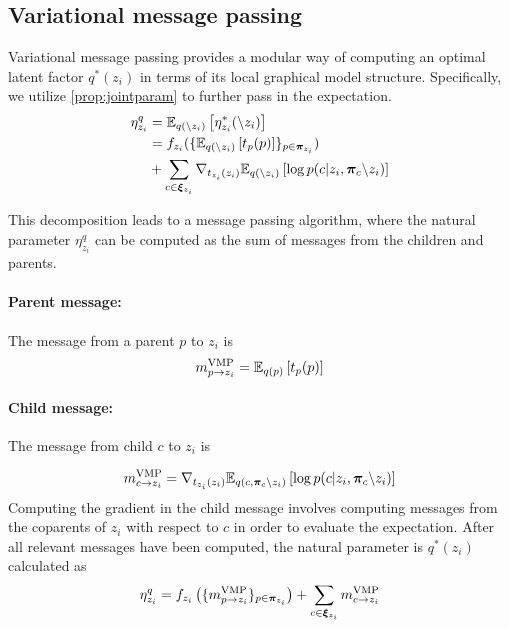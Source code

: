 \subsection{Variational message passing}

Variational message passing provides a modular way of
computing
an optimal latent factor $q^*(z_i)$
in terms of its local graphical model structure.
Specifically, we utilize \autoref{prop:jointparam}
to further pass in the expectation.
\begin{equation}
\begin{split}
    \eta^q_{z_i} &= \mathbb{E}_{q(\backslash z_i)}\left[\eta^*_{z_i}(\backslash z_i)\right] \\
                 &= f_{z_i}(\{\mathbb{E}_{q(\backslash z_i)}\left[t_p(p)\right]\}_{p \in \bm{\pi}_{z_i}}) \\
                 &+ \sum_{c \in \bm{\xi}_{z_i}} 
         \nabla_{t_{z_i}(z_i)} \mathbb{E}_{q(\backslash z_i)}\left[\log p(c | z_i, \bm{\pi}_{c} \backslash z_i)\right]
\end{split}
\end{equation}

This decomposition leads to a message passing algorithm, where
the natural parameter $\eta^q_{z_i}$
can be computed as the sum of messages from the children and parents.
\paragraph{Parent message:}
The message from a parent $p$ to $z_i$ is
\begin{equation} \label{eq:parentmessage}
    m^{\text{VMP}}_{p \rightarrow z_i} = \mathbb{E}_{q(p)}\left[t_p(p)\right]
\end{equation}

\paragraph{Child message:}
The message from child $c$ to $z_i$ is

\begin{equation} \label{eq:childmessage}
    m^{\text{VMP}}_{c \rightarrow z_i} = \nabla_{t_{z_i}(z_i)} \mathbb{E}_{q(c, \bm{\pi}_{c} \backslash z_i)}\left[\log p(c | z_i, \bm{\pi}_{c} \backslash z_i)\right]
\end{equation}
Computing the gradient in the child message involves
computing messages from the coparents of $z_i$ with respect to $c$ in order to evaluate the expectation.
After all relevant messages
have been computed, the natural parameter is $q^*(z_i)$ calculated as
\begin{equation}
    \label{eq:vmpparam}
   \eta^q_{z_i} = f_{z_i}\left(\{m^{\text{VMP}}_{p \rightarrow z_i}\}_{p \in \bm{\pi}_{z_i}}\right) + \sum_{c \in \bm{\xi}_{z_i}} m^{\text{VMP}}_{c \rightarrow z_i}
\end{equation}

